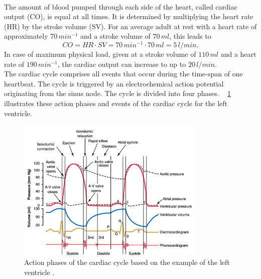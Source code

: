 \\ The amount of blood pumped through each side of the heart,  called cardiac output (CO), is equal at all times. It is determined by multiplying the heart rate (HR) by the stroke volume (SV). For an average adult at rest with a heart rate of approximately $70\, min^{-1}$ and a stroke volume of $70 \, ml$, this leads to
 \begin{equation}
   CO = HR \cdot SV = 70\, min^{-1} \cdot 70 \,ml = 5 \,l/min.
  \label{eq:CO}
 \end{equation}
In case of maximum physical load, given at a stroke volume of $110\,ml$ and a heart rate of $190 \, min^{-1}$,  the cardiac output can increase to up to $20\,l/min$. \cite{HKS4}
\\The cardiac cycle comprises all events that occur during the time-span of one heartbeat. The cycle is triggered by an electrochemical action potential originating from the sinus node. The cycle is divided into four phases. \figurename~ \ref{fig:cardiac_cycle} illustrates these action phases and events of the cardiac cycle for the left ventricle.
\begin{figure}[ht]
  \centering
  \includegraphics[width=0.8\textwidth]{images/chapt_2/cardiac_cycle.jpg}
  \caption[Action phases of left ventricular cardiac cycle \cite{GH20}]{Action phases of the cardiac cycle based on the example of the left ventricle \cite{GH20}.}
  \label{fig:cardiac_cycle}
\end{figure}
